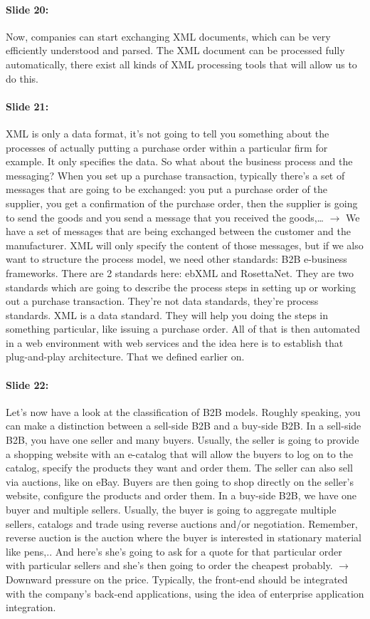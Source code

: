 \documentclass[10pt,a4paper]{report}
\begin{document}
\paragraph{Slide 20:}Now, companies can start exchanging XML documents, which can be very efficiently understood and parsed. The XML document can be processed fully automatically, there exist all kinds of XML processing tools that will allow us to do this.

\paragraph{Slide 21:}XML is only a data format, it's not going to tell you something about the processes of actually putting a purchase order within a particular firm for example. It only specifies the data. So what about the business process and the messaging? When you set up a purchase transaction, typically there's a set of messages that are going to be exchanged: you put a purchase order of the supplier, you get a confirmation of the purchase order, then the supplier is going to send the goods and you send a message that you received the goods,… $\rightarrow$ We have a set of messages that are being exchanged between the customer and the manufacturer. XML will only specify the content of those messages, but if we also want to structure the process model, we need other standards: B2B e-business frameworks. There are 2 standards here: ebXML and RosettaNet. They are two standards which are going to describe the process steps in setting up or working out a purchase transaction. They're not data standards, they're process standards. XML is a data standard. They will help you doing the steps in something particular, like issuing a purchase order. All of that is then automated in a web environment with web services and the idea here is to establish that plug-and-play architecture. That we defined earlier on.

\paragraph{Slide 22:}Let's now have a look at the classification of B2B models. Roughly speaking, you can make a distinction between a sell-side B2B and a buy-side B2B. In a sell-side B2B, you have one seller and many buyers. Usually, the seller is going to provide a shopping website with an e-catalog that will allow the buyers to log on to the catalog, specify the products they want and order them. The seller can also sell via auctions, like on eBay. Buyers are then going to shop directly on the seller's website, configure the products and order them.
In a buy-side B2B, we have one buyer and multiple sellers. Usually, the buyer is going to aggregate multiple sellers, catalogs and trade using reverse auctions and/or negotiation. Remember, reverse auction is the auction where the buyer is interested in stationary material like pens,.. And here's she's going to ask for a quote for that particular order with particular sellers and she's then going to order the cheapest probably. $\rightarrow$ Downward pressure on the price. Typically, the front-end should be integrated with the company's back-end applications, using the idea of enterprise application integration.
\end{document}
